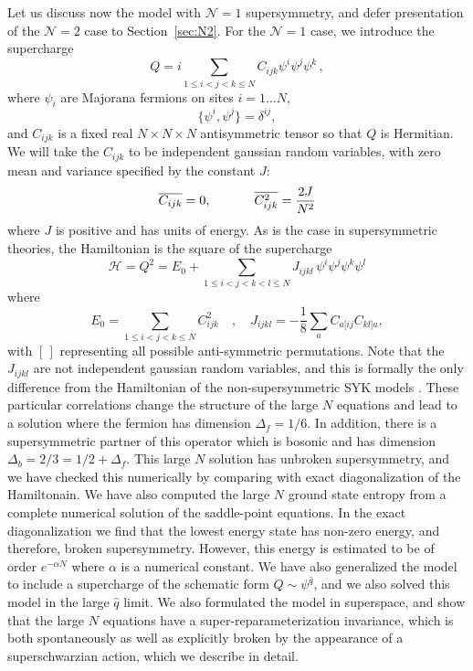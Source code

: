 \documentclass[aps,pre,preprint,onecolumn,citeautoscript,superscriptaddress,nofootinbib,eqsecnum]{revtex4-1}
\newcommand{\beq}{\begin{equation}}
\newcommand{\eeq}{\end{equation}}
\begin{document}
Let us  discuss now  the model with $\mathcal{N}=1$ supersymmetry, and defer presentation of the $\mathcal{N}=2$ case
to Section~\ref{sec:N2}. For the $\mathcal{N}=1$ case, we introduce the supercharge
\beq
Q=i \sum_{1\leqslant i<j<k\leqslant N} C_{ijk}\psi^i\psi^j\psi^k \, ,
\label{defQ}
\eeq
where $\psi_i$ are Majorana fermions on sites $i=1 \ldots N$, 
\beq
\{\psi^i , \psi^j \} = \delta^{ij},
\eeq
and $C_{ijk}$ is a fixed real  $N\times N\times N$ antisymmetric tensor so that $Q$ is Hermitian. 
We will take the $C_{ijk}$ to be independent gaussian random variables, with zero mean and variance specified by the constant $J$: %
\beq
\overline{C_{ijk}}=0,\quad ~~~~~~~ \overline{C_{ijk}^2}= { 2 J \over N^2 }  
\label{CCaverage}
\eeq
where $J$ is positive and has units of energy. 
As is the case in supersymmetric theories, the Hamiltonian is the square of the supercharge
\beq
\mathcal{H}=Q^2=
 E_0 +\sum_{1\leqslant i<j<k<l\leqslant N}J_{ijkl} \, \psi^i\psi^j\psi^k\psi^l
\label{SuperSYKH}
\eeq
where
\beq
 E_0=\sum_{1\leqslant i<j<k\leqslant N}C_{ijk}^2 \quad , \quad  J_{ijkl}=-\frac{1}{8}\sum_a C_{a[ij}C_{kl]a},
\eeq
with $[\,]$ representing all possible anti-symmetric permutations. Note that the $J_{ijkl}$ are not independent gaussian random variables,
and this is formally the only difference from the Hamiltonian of the non-supersymmetric SYK models
\cite{kitaev2015talk,SS15,Hosur15,JPRV16,YLX16,WFSS16,Jevicki16,Jevicki16b,JMDS16,DHT16,BAK16}. 
These particular correlations change the structure of the large $N$ equations and lead to a solution where the fermion has dimension 
$\Delta_f = 1/6 $. In addition, there is a supersymmetric partner of this operator which is bosonic and has dimension $\Delta_b = 2/3 = 1/2 + \Delta_f$. 
This large $N$ solution has unbroken supersymmetry, and we have checked this numerically by comparing with exact diagonalization of the Hamiltonain. 
We have also computed the large $N$ ground state entropy from a complete numerical solution of the saddle-point equations. In the exact diagonalization we find that the 
lowest energy state has non-zero energy, and therefore, broken supersymmetry. However, this energy is estimated to be of order $e^{ - \alpha N }$ where $\alpha $ is a numerical
constant. 
We have also generalized the model to include a supercharge of the schematic form $Q \sim \psi^{\hat q }$, and we also solved this model in the large $\hat q$ limit. 
We also formulated the model in superspace, and show that the large $N$ equations have a super-reparameterization invariance, which is both 
spontaneously as well as explicitly broken by the appearance of a superschwarzian action, which we describe in   detail. 
\end{document}
